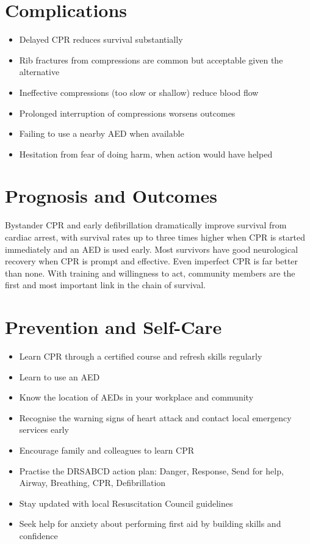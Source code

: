\section*{Complications}
\begin{itemize}
    \item Delayed CPR reduces survival substantially
    \item Rib fractures from compressions are common but acceptable given the alternative
    \item Ineffective compressions (too slow or shallow) reduce blood flow
    \item Prolonged interruption of compressions worsens outcomes
    \item Failing to use a nearby AED when available
    \item Hesitation from fear of doing harm, when action would have helped
\end{itemize}

\section*{Prognosis and Outcomes}
Bystander CPR and early defibrillation dramatically improve survival from cardiac arrest, with survival rates up to three times higher when CPR is started immediately and an AED is used early. Most survivors have good neurological recovery when CPR is prompt and effective. Even imperfect CPR is far better than none. With training and willingness to act, community members are the first and most important link in the chain of survival.

\section*{Prevention and Self-Care}
\begin{itemize}
    \item Learn CPR through a certified course and refresh skills regularly
    \item Learn to use an AED
    \item Know the location of AEDs in your workplace and community
    \item Recognise the warning signs of heart attack and contact local emergency services early
    \item Encourage family and colleagues to learn CPR
    \item Practise the DRSABCD action plan: Danger, Response, Send for help, Airway, Breathing, CPR, Defibrillation
    \item Stay updated with local Resuscitation Council guidelines
    \item Seek help for anxiety about performing first aid by building skills and confidence
\end{itemize}

